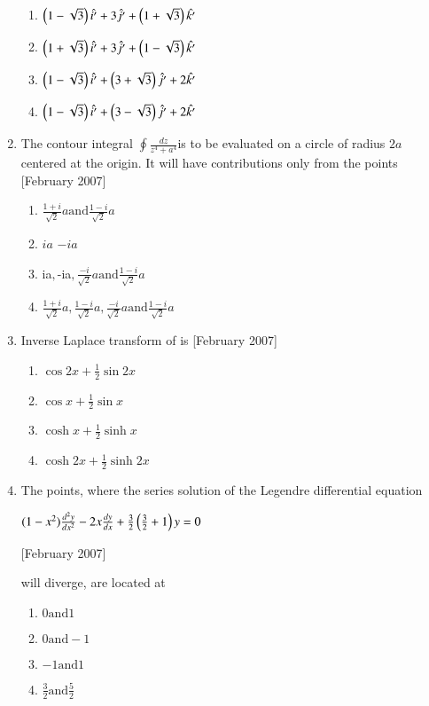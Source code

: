 \documentclass[journal]{IEEEtran}
\begin{document}
\begin{enumerate}
\begin{enumerate}
\item $\left(1-\sqrt{3}\right)\hat{i'} + 3\hat{j'} + \left(1+\sqrt{3}\right)\hat{k'}$
\item $\left(1+\sqrt{3}\right)\hat{i'} + 3\hat{j'} + \left(1-\sqrt{3}\right)\hat{k'}$
\item $\left(1-\sqrt{3}\right)\hat{i'} + \left(3+\sqrt{3}\right)\hat{j'} + 2\hat{k'}$
\item $\left(1-\sqrt{3}\right)\hat{i'} + \left(3-\sqrt{3}\right)\hat{j'} + 2\hat{k'}$
\end{enumerate}
\item The contour integral  $\oint \frac{dz}{z^4 + a^4}$is to be evaluated on a circle of radius $2a$ centered at the origin. It will have contributions only from the points \hfill[February 2007]
\begin{enumerate}
\item $ \frac{1+i}{\sqrt{2}}a  \text{and}  \frac{1-i}{\sqrt{2}}a$

\item   $ia$    $-ia$
\item $  $ia$,  $-ia$,  \frac{-i}{\sqrt{2}}a \text{and}  \frac{1-i}{\sqrt{2}}a$
\item $  \frac{1+i}{\sqrt{2}}a,  \frac{1-i}{\sqrt{2}}a,  \frac{-i}{\sqrt{2}}a  \text{and}  \frac{1-i}{\sqrt{2}}a$
\end{enumerate}
\item Inverse Laplace transform of  is \hfill[February 2007]
\begin{enumerate}
\item $ \cos {2x} + \frac{1}{2}\sin {2x}$
\item $ \cos {x} + \frac{1}{2}\sin {x}$

\item $\cosh {x} + \frac{1}{2}\sinh {x}$
\item $ \cosh {2x} + \frac{1}{2}\sinh {2x}$
\end{enumerate}
\item The points, where the series solution of the Legendre differential equation

\begin{center}
    $(1 - x^2)\frac{d^2 y}{dx^2} - 2x\frac{dy}{dx} + \frac{3}{2}\left(\frac{3}{2}+1\right)y = 0 $ \end{center} \hfill[February 2007]

will diverge, are located at
\begin{enumerate}
\item $  0 \text{and}  1$
\item $  0 \text{and} -1$
\item $ -1 \text{and}  1$
\item $ \frac{3}{2}  \text{and} \frac{5}{2} $
\end{enumerate}


\end{enumerate}
\end{document}
